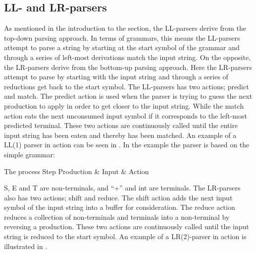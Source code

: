 \subsection{LL- and LR-parsers}
\label{subsec:llparsersandlrparsers}
As mentioned in the introduction to the section, the LL-parsers derive from the
top-down parsing approach. In terms of grammars, this means the LL-parsers
attempt to parse a string by starting at the start symbol of the grammar and
through a series of left-most derivations match the input string. On the
opposite, the LR-parsers derive from the bottom-up parsing approach. Here the
LR-parsers attempt to parse by starting with the input string and through a
series of reductions get back to the start symbol.  The LL-parsers has two
actions; predict and match. The predict action is used when the parser is trying
to guess the next production to apply in order to get closer to the input
string. While the match action eats the next unconsumed input symbol if it
corresponds to the left-most predicted terminal. These two actions are
continuously called until the entire input string has been eaten and thereby has
been matched. An example of a LL(1) parser in action can be seen in
. In the example the parser is based on the simple grammar: 

\begin{centering}
\begin{ebnf}
\end{ebnf}
\end{centering}

	      {The process                                          }
{Step  	 }{Production & Input       & Action                        }{
}

S, E and T are non-terminals, and ``+'' and int are terminals. The LR-parsers
also has two actions; shift and reduce. The shift action adds the next input
symbol of the input string into a buffer for consideration.  The reduce action
reduces a collection of non-terminals and terminals into a non-terminal by
reversing a production. These two actions are continuously called until the
input string is reduced to the start symbol.
\cite{LL(1)andLR(2)inaction} 
An example of a LR(2)-parser in action is illustrated in .

